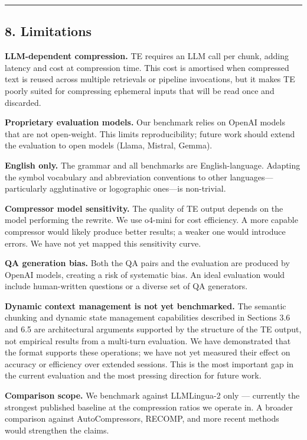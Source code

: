 \documentclass[
]{article}
\begin{document}
\begin{center}\rule{0.5\linewidth}{0.5pt}\end{center}

\subsection{8. Limitations}\label{limitations}

\textbf{LLM-dependent compression.} TE requires an LLM call per chunk,
adding latency and cost at compression time. This cost is amortised when
compressed text is reused across multiple retrievals or pipeline
invocations, but it makes TE poorly suited for compressing ephemeral
inputs that will be read once and discarded.

\textbf{Proprietary evaluation models.} Our benchmark relies on OpenAI
models that are not open-weight. This limits reproducibility; future
work should extend the evaluation to open models (Llama, Mistral,
Gemma).

\textbf{English only.} The grammar and all benchmarks are
English-language. Adapting the symbol vocabulary and abbreviation
conventions to other languages---particularly agglutinative or
logographic ones---is non-trivial.

\textbf{Compressor model sensitivity.} The quality of TE output depends
on the model performing the rewrite. We use o4-mini for cost efficiency.
A more capable compressor would likely produce better results; a weaker
one would introduce errors. We have not yet mapped this sensitivity
curve.

\textbf{QA generation bias.} Both the QA pairs and the evaluation are
produced by OpenAI models, creating a risk of systematic bias. An ideal
evaluation would include human-written questions or a diverse set of QA
generators.

\textbf{Dynamic context management is not yet benchmarked.} The semantic
chunking and dynamic state management capabilities described in Sections
3.6 and 6.5 are architectural arguments supported by the structure of
the TE output, not empirical results from a multi-turn evaluation. We
have demonstrated that the format supports these operations; we have not
yet measured their effect on accuracy or efficiency over extended
sessions. This is the most important gap in the current evaluation and
the most pressing direction for future work.

\textbf{Comparison scope.} We benchmark against LLMLingua-2 only ---
currently the strongest published baseline at the compression ratios we
operate in. A broader comparison against AutoCompressors, RECOMP, and
more recent methods would strengthen the claims.
\end{document}
